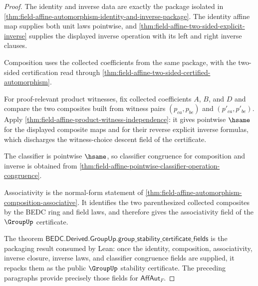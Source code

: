 \begin{proof}
The identity and inverse data are exactly the package isolated in
\autoref{thm:field-affine-automorphism-identity-and-inverse-package}. The
identity affine map supplies both unit laws pointwise, and
\autoref{thm:field-affine-two-sided-explicit-inverse} supplies the displayed
inverse operation with its left and right inverse clauses.

Composition uses the collected coefficients from the same package, with the
two-sided certification read through
\autoref{thm:field-affine-two-sided-certified-automorphism}.

For proof-relevant product witnesses, fix collected coefficients $A$, $B$, and
$D$ and compare the two composites built from witness pairs
$(p_{ca},p_{be})$ and $(p'_{ca},p'_{be})$. Apply
\autoref{thm:field-affine-product-witness-independence}: it gives pointwise
$\hsame$ for the displayed composite maps and for their reverse explicit
inverse formulas, which discharges the witness-choice descent field of the
certificate.

The classifier is pointwise $\hsame$, so classifier congruence for composition
and inverse is obtained from
\autoref{thm:field-affine-pointwise-classifier-operation-congruence}.

Associativity is the normal-form statement of
\autoref{thm:field-affine-automorphism-composition-associative}. It identifies
the two parenthesized collected composites by the BEDC ring and field laws, and
therefore gives the associativity field of the $\GroupUp$ certificate.

The theorem
$\mathsf{BEDC.Derived.GroupUp.group\_stability\_certificate\_fields}$ is the
packaging result consumed by Lean: once the identity, composition,
associativity, inverse closure, inverse laws, and classifier congruence fields
are supplied, it repacks them as the public $\GroupUp$ stability certificate.
The preceding paragraphs provide precisely those fields for
$\mathsf{AffAut}_F$.
\end{proof}

